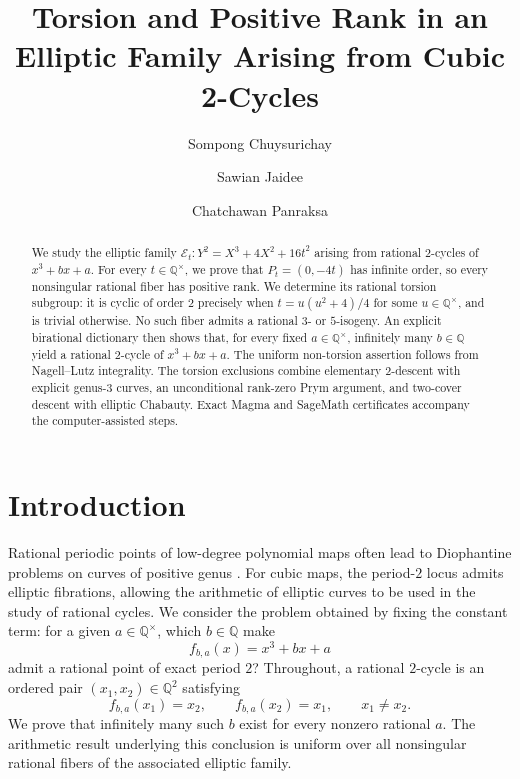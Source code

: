 \documentclass[11pt,a4paper]{amsart}
\title[Torsion and Rank in a Cubic 2-Cycle Family]{Torsion and Positive Rank in an Elliptic Family Arising from Cubic 2-Cycles}
\author[S. Chuysurichay]{Sompong Chuysurichay}
\author[S. Jaidee]{Sawian Jaidee}
\author[C. Panraksa]{Chatchawan Panraksa}
\date{}
\theoremstyle{definition}
\theoremstyle{remark}
\numberwithin{equation}{section}
\newcommand{\Q}{\mathbb{Q}}
\begin{document}
\begin{abstract}
We study the elliptic family \(\mathcal{E}_t:Y^2=X^3+4X^2+16t^2\) arising
from rational \(2\)-cycles of \(x^3+bx+a\). For every
\(t\in\mathbb{Q}^\times\), we prove that \(P_t=(0,-4t)\) has infinite
order, so every nonsingular rational fiber has positive rank. We determine
its rational torsion subgroup: it is cyclic of order \(2\) precisely when \(t=u(u^2+4)/4\) for some
\(u\in\mathbb{Q}^\times\), and is trivial otherwise. No such fiber admits
a rational \(3\)- or \(5\)-isogeny. An explicit birational dictionary
then shows that, for every fixed \(a\in\mathbb{Q}^\times\), infinitely many
\(b\in\mathbb{Q}\) yield a rational \(2\)-cycle of \(x^3+bx+a\).
The uniform non-torsion assertion follows from Nagell--Lutz integrality.
The torsion exclusions combine elementary \(2\)-descent with explicit
genus-\(3\) curves, an unconditional rank-zero Prym argument, and two-cover
descent with elliptic Chabauty. Exact Magma and SageMath certificates
accompany the computer-assisted steps.
\end{abstract}

\maketitle

\section{Introduction}\label{sec:introduction}

Rational periodic points of low-degree polynomial maps often lead to
Diophantine problems on curves of positive genus
\cite{morton1994rational,morton1995periodic,silverman2007dynamics,
poonen2012uniform,flynn1996cycles,stoll2006rational}. For cubic maps, the
period-$2$ locus admits elliptic fibrations, allowing the arithmetic of
elliptic curves to be used in the study of rational cycles. We consider
the problem obtained by fixing the constant term: for a given
$a\in\Q^\times$, which $b\in\Q$ make
\begin{equation}\label{eq:intro-fba}
f_{b,a}(x)=x^3+bx+a
\end{equation}
admit a rational point of exact period $2$? Throughout, a rational
$2$-cycle is an ordered pair $(x_1,x_2)\in\Q^2$ satisfying
\[
f_{b,a}(x_1)=x_2,\qquad f_{b,a}(x_2)=x_1,\qquad x_1\neq x_2.
\]
We prove that infinitely many such $b$ exist for every nonzero rational
$a$. The arithmetic result underlying this conclusion is uniform over
all nonsingular rational fibers of the associated elliptic family.
\end{document}
